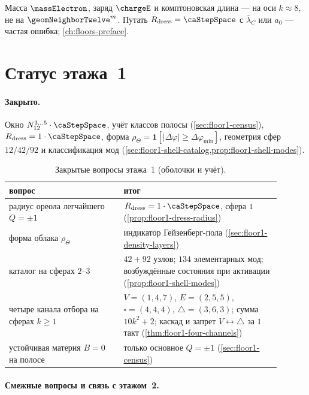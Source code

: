 Масса $\massElectron$, заряд $\chargeE$ и комптоновская длина --- на оси $k\approx 8$,
не на $\geomNeighborTwelve^{m}$.
Путать $R_{\mathrm{dress}}=\caStepSpace$ с $\bar\lambda_C$ или $a_0$ --- частая ошибка;
\cref{ch:floors-preface}.

\section{Статус этажа~1}
\label{sec:floor1-open}

\paragraph{Закрыто.}
Окно $N_{12}^{3\ldots5}\cdot\caStepSpace$, учёт классов полосы (\cref{sec:floor1-census}),
$R_{\mathrm{dress}}=1\cdot\caStepSpace$,
форма $\rho_\Theta=\mathbf{1}[|\Delta\varphi|\ge\Delta\varphi_{\min}]$,
геометрия сфер $12/42/92$ и классификация мод (\cref{sec:floor1-shell-catalog,prop:floor1-shell-modes}).

\begin{table}[htbp]
  \centering
  \caption{Закрытые вопросы этажа~1 (оболочки и учёт).}
  \label{tab:floor1-closed}
  \begin{tabular}{@{}p{0.38\linewidth}p{0.52\linewidth}@{}}
    \toprule
    вопрос & итог \\
    \midrule
    радиус ореола легчайшего $Q=\pm1$ &
    $R_{\mathrm{dress}}=1\cdot\caStepSpace$, сфера $1$ (\cref{prop:floor1-dress-radius}) \\
    форма облака $\rho_\Theta$ &
    индикатор Гейзенберг-пола (\cref{sec:floor1-density-layers}) \\
    каталог на сферах $2$--$3$ &
    $42+92$ узлов; $134$ элементарных мод; возбуждённые состояния при активации (\cref{prop:floor1-shell-modes}) \\
    четыре канала отбора на сферах $k\ge 1$ &
    $V=(1,4,7)$, $E=(2,5,5)$, $\square=(4,4,4)$, $\triangle=(3,6,3)$; сумма $10k^2+2$; каскад и запрет $V\leftrightarrow\triangle$ за $1$ такт (\cref{thm:floor1-four-channels}) \\
    устойчивая материя $B=0$ на полосе &
    только основное $Q=\pm1$ (\cref{sec:floor1-census}) \\
    \bottomrule
  \end{tabular}
\end{table}

\paragraph{Смежные вопросы и связь с этажом~2.}


